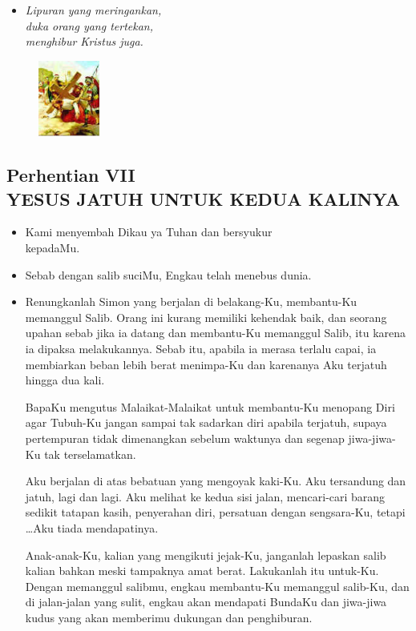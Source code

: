 \documentclass[a5paper,headsepline,titlepage,10pt,nnormalheadings,DIVcalc]{scrbook}
\newcommand{\BU}[1]{\begin{itemize} \item[U:] #1 \end{itemize}}
\newcommand{\BP}[1]{\begin{itemize} \item[P:] #1 \end{itemize}}
\newcommand{\kamiMenyembah}{\BP{ Kami menyembah Dikau ya Tuhan dan bersyukur\\kepadaMu.}
\BU{ Sebab dengan salib suciMu, Engkau telah menebus dunia.}
}
\begin{document}
\begin{itemize}
\item[7.] \it{
Lipuran yang meringankan,\\ 
	duka orang yang tertekan,\\ 
	menghibur Kristus juga.
}
\end{itemize}

\begin{figure}
\includegraphics[width=2cm]{jalansalib_files/07_small.jpg}
\end{figure}

\subsection*{Perhentian VII\\
YESUS JATUH UNTUK KEDUA KALINYA}

\kamiMenyembah

\BP{Renungkanlah Simon yang berjalan di belakang-Ku, membantu-Ku memanggul Salib. Orang ini kurang memiliki kehendak baik, dan seorang upahan sebab jika ia datang dan membantu-Ku memanggul Salib, itu karena ia dipaksa melakukannya. Sebab itu, apabila ia merasa terlalu capai, ia membiarkan beban lebih berat menimpa-Ku dan karenanya Aku terjatuh hingga dua kali.

BapaKu mengutus Malaikat-Malaikat untuk membantu-Ku menopang Diri agar Tubuh-Ku jangan sampai tak sadarkan diri apabila terjatuh, supaya pertempuran tidak dimenangkan sebelum waktunya dan segenap jiwa-jiwa-Ku tak terselamatkan.

Aku berjalan di atas bebatuan yang mengoyak kaki-Ku. Aku tersandung dan jatuh, lagi dan lagi. Aku melihat ke kedua sisi jalan, mencari-cari barang sedikit tatapan kasih, penyerahan diri, persatuan dengan sengsara-Ku, tetapi  \dots  Aku tiada mendapatinya.

Anak-anak-Ku, kalian yang mengikuti jejak-Ku, janganlah lepaskan salib kalian bahkan meski tampaknya amat berat. Lakukanlah itu untuk-Ku. Dengan memanggul salibmu, engkau membantu-Ku memanggul salib-Ku, dan di jalan-jalan yang sulit, engkau akan mendapati BundaKu dan jiwa-jiwa kudus yang akan memberimu dukungan dan penghiburan. }
\end{document}
